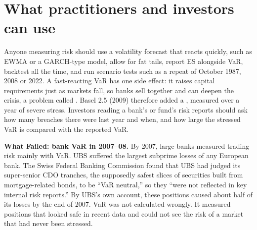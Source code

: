 \section{What practitioners and investors can use}
\label{sec:11-investors}

Anyone measuring risk should use a volatility forecast that reacts quickly, such as EWMA or a GARCH-type model, allow for fat tails, report ES alongside VaR, backtest all the time, and run scenario tests such as a repeat of October 1987, 2008 or 2022. A fast-reacting VaR has one side effect: it raises capital requirements just as markets fall, so banks sell together and can deepen the crisis, a problem called . Basel 2.5 (2009) therefore added a , measured over a year of severe stress. Investors reading a bank's or fund's risk reports should ask how many breaches there were last year and when, and how large the stressed VaR is compared with the reported VaR.

\textbf{What Failed: bank VaR in 2007--08.} By 2007, large banks measured trading risk mainly with VaR. UBS suffered the largest subprime losses of any European bank. The Swiss Federal Banking Commission found that UBS had judged its super-senior CDO tranches, the supposedly safest slices of securities built from mortgage-related bonds, to be ``VaR neutral,'' so they ``were not reflected in key internal risk reports.'' By UBS's own account, these positions caused about half of its losses by the end of 2007. VaR was not calculated wrongly. It measured positions that looked safe in recent data and could not see the risk of a market that had never been stressed.

\makeatletter
{}
\makeatother

